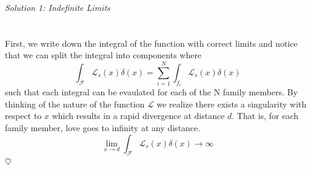 \documentclass[12 pt]{article}
\begin{document}
\begin{insideright}
\textit{Solution 1: Indefinite Limits} \\ 
%
\\~\\
First, we write down the integral of the function with correct limits and notice that we can split the integral into components where 
%
\begin{equation*}
\int_{\mathcal{F}}\mathcal{L}_s(x)\delta(x) = 
\sum_{i=1}^{N}\int_{f_i}{\mathcal{L}_s(x)\delta(x)}
\end{equation*}
%
such that each integral can be evaulated for each of the N family members. By thinking of the nature of the function $\mathcal{L}$ we realize there exists a singularity with respect to $x$ which results in a rapid divergence at distance $d$. That is, for each family member, love goes to infinity at any distance. 
%
\begin{equation*}
\lim_{x\to{d}}\int_{\mathcal{F}}{\mathcal{L}_s(x)\delta(x)} \to \infty 
\end{equation*}
%
\centering$\heartsuit$
%
\end{insideright}
\end{document}
